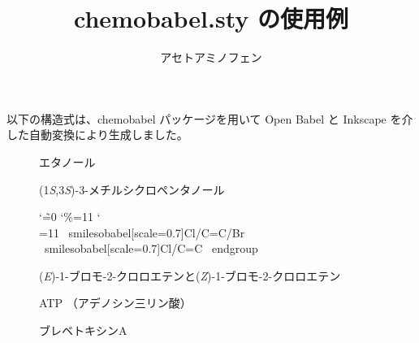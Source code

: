 \documentclass{jsarticle}
\title{\textsf{chemobabel.sty} の使用例}
\author{アセトアミノフェン}
\begin{document}
\maketitle
以下の構造式は、\textsf{chemobabel} パッケージを用いて Open Babel と Inkscape を介した自動変換により生成しました。

\begin{figure}[ht]
  \centering
  \caption{エタノール}
\end{figure}

\begin{figure}[ht]
  \centering
  \caption{(1\textit{S},3\textit{S})-3-メチルシクロペンタノール}
\end{figure}

\begin{figure}[ht]
   \centering
  \begingroup
    \catcode`\~=0
    \catcode`\%=11
    \catcode`\\=11
    ~smilesobabel[scale=0.7]{Cl/C=C/Br}{}
    ~smilesobabel[scale=0.7]{Cl/C=C\Br}{}
  ~endgroup
  \caption{(\textit{E})-1-ブロモ-2-クロロエテンと(\textit{Z})-1-ブロモ-2-クロロエテン}
\end{figure}

\begin{figure}[ht]
  \centering
  \caption{ATP （アデノシン三リン酸）}
\end{figure}

\begin{figure}[ht]
  \centering
  \caption{ブレベトキシンA}
\end{figure}
\end{document}
